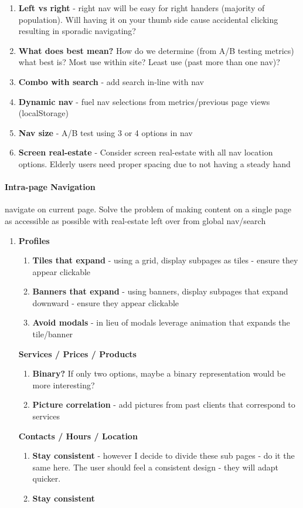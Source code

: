 \begin{enumerate}
\begin{enumerate}
  \item
    \textbf{Left vs right} - right nav will be easy for right handers (majority of population). Will having it on your thumb side cause accidental clicking resulting in sporadic navigating?
  \item
    \textbf{What does best mean?} How do we determine (from A/B testing metrics) what best is? Most use within site? Least use (past more than one nav)?
  \item
    \textbf{Combo with search} - add search in-line with nav
  \item
    \textbf{Dynamic nav} - fuel nav selections from metrics/previous page views (localStorage)
  \item
    \textbf{Nav size} - A/B test using 3 or 4 options in nav
  \item
    \textbf{Screen real-estate} - Consider screen real-estate with all nav location options. Elderly users need proper spacing due to not having a steady hand
  \end{enumerate}
\end{enumerate}

\paragraph{Intra-page Navigation} navigate on current page. Solve the problem of making content on a single page as accessible as possible with real-estate left over from global nav/search

\begin{enumerate}
\item
  \textbf{Profiles}
  \begin{enumerate}
  \item
    \textbf{Tiles that expand} - using a grid, display subpages as tiles - ensure they appear clickable
  \item
    \textbf{Banners that expand} - using banners, display subpages that expand downward - ensure they appear clickable
  \item
    \textbf{Avoid modals} - in lieu of modals leverage animation that expands the tile/banner
  \end{enumerate}
  \textbf{Services / Prices / Products}
  \begin{enumerate}
  \item
    \textbf{Binary?} If only two options, maybe a binary representation would be more interesting?
  \item
    \textbf{Picture correlation} - add pictures from past clients that correspond to services
  \end{enumerate}
  \textbf{Contacts / Hours / Location}
  \begin{enumerate}
  \item
    \textbf{Stay consistent} - however I decide to divide these sub pages - do it the same here. The user should feel a consistent design - they will adapt quicker.
  \item
    \textbf{Stay consistent}
  \end{enumerate}
\end{enumerate}


